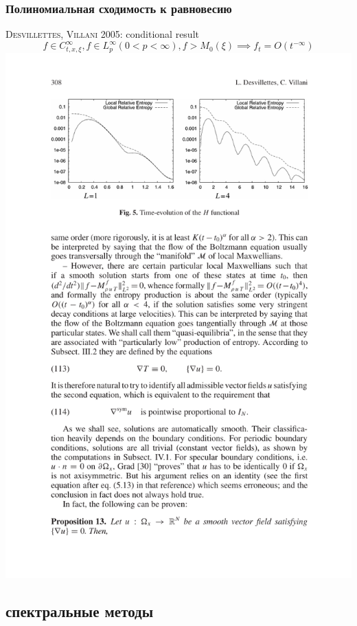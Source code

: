 \documentclass[mathserif]{beamer} %
\newcommand{\OO}[1]{O(#1)}
\newcommand{\Cite}[2][]{\alert{\textsc{#2 #1}}}
\begin{document}
\begin{frame}
    \frametitle{Полиномиальная сходимость к равновесию}
    \Cite[2005]{Desvillettes, Villani}: conditional result
    \[ f\in C^\infty_{t,x,\xi}, f\in L^\infty_p (0<p<\infty), f>M_0(\xi) \implies f_t = \OO{t^{-\infty}} \]
    \hspace*{-20pt}\includegraphics{../boltzmann_math/cutted/filbet}
\end{frame}

\subsection{спектральные методы}
\end{document}
